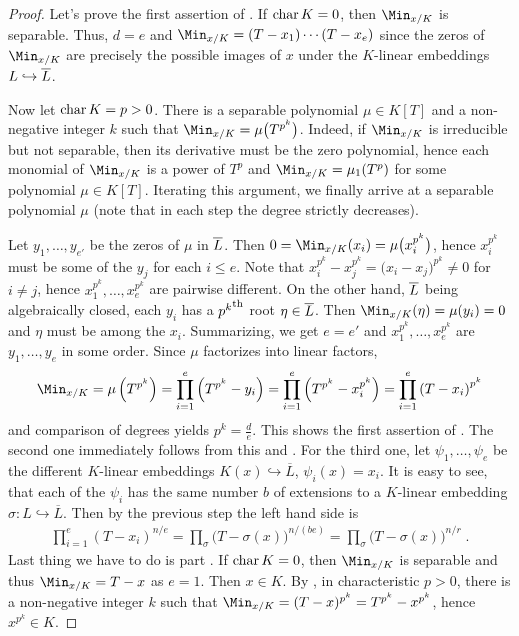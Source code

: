 \documentclass[a4paper,parskip=half,numbers=enddot, DIV=12]{scrreprt}
\begin{document}
\begin{proof}
		Let's prove the first assertion of . If $\operatorname{char} K=0$, then $\Min_{x/K}$ is separable. Thus, $d=e$ and $\Min_{x/K}=(T-x_1)\cdots(T-x_e)$ since the zeros of $\Min_{x/K}$ are precisely the possible images of $x$ under the $K$-linear embeddings $L\hookrightarrow \overline L$.
		
		Now let $\operatorname{char} K=p>0$. There is a separable polynomial $\mu\in K[T]$ and a non-negative integer $k$ such that $\Min_{x/K}=\mu\big(T^{p^k}\big)$. Indeed, if $\Min_{x/K}$ is irreducible but not separable, then its derivative must be the zero polynomial, hence each monomial of $\Min_{x/K}$ is a power of $T^p$ and $\Min_{x/K}=\mu_1(T^p)$ for some polynomial $\mu\in K[T]$. Iterating this argument, we finally arrive at a separable polynomial $\mu$ (note that in each step the degree strictly decreases). 
		
		Let $y_1,\ldots,y_{e'}$ be the zeros of $\mu$ in $\overline L$.  Then $0=\Min_{x/K}(x_i)=\mu\big(x_i^{p^k}\big)$, hence $x_i^{p^k}$ must be some of the $y_j$ for each $i\leq e$. Note that $x_i^{p^k}-x_j^{p^k}=\big(x_i-x_j\big)^{p^k}\not=0$ for $i\not=j$, hence $x_1^{p^k},\ldots,x_e^{p^k}$ are pairwise different. On the other hand, $\overline L$ being algebraically closed, each $y_i$ has a ${p^k}^{\text{th}}$ root $\eta\in\overline L$. Then $\Min_{x/K}(\eta)=\mu(y_i)=0$ and $\eta$ must be among the $x_i$. Summarizing, we get $e=e'$ and $x_1^{p^k},\ldots,x_e^{p^k}$ are $y_1,\ldots,y_e$ in some order.  Since $\mu$ factorizes into linear factors,
		\begin{align*}
			\Min_{x/K}=\mu\left(T^{p^k}\right)=\prod_{i=1}^{e}\left(T^{p^k}-y_i\right)=\prod_{i=1}^{e}\left(T^{p^k}-x_i^{p^k}\right)=\prod_{i=1}^{e}\left(T-x_i\right)^{p^k}
		\end{align*}
		and comparison of degrees yields $p^k=\frac{d}{e}$. This shows the first assertion of . The second one immediately follows from this and . For the third one, let $\psi_1,\ldots,\psi_e$ be the different $K$-linear embeddings $K(x)\hookrightarrow\overline{L}$, $\psi_i(x)=x_i$. It is easy to see, that each of the $\psi_i$ has the same number $b$ of extensions to a $K$-linear embedding $\sigma\colon L\hookrightarrow \overline{L}$. Then by the previous step the left hand side is 
		\begin{align*}
			\prod_{i=1}^e(T-x_i)^{n/e} = \prod_\sigma \big(T-\sigma(x)\big)^{n/(be)} = \prod_\sigma \big(T-\sigma(x)\big)^{n/r}\;.
		\end{align*}
		Last thing we have to do is part . If $\operatorname{char} K=0$, then $\Min_{x/K}$ is separable and thus $\Min_{x/K}=T-x$ as $e=1$. Then $x\in K$.  By , in characteristic $p>0$, there is a non-negative integer $k$ such that $\Min_{x/K}=(T-x)^{p^k}=T^{p^k}-x^{p^k}$, hence $x^{p^k}\in K$.
\end{proof}

\printbibliography
\end{document}
